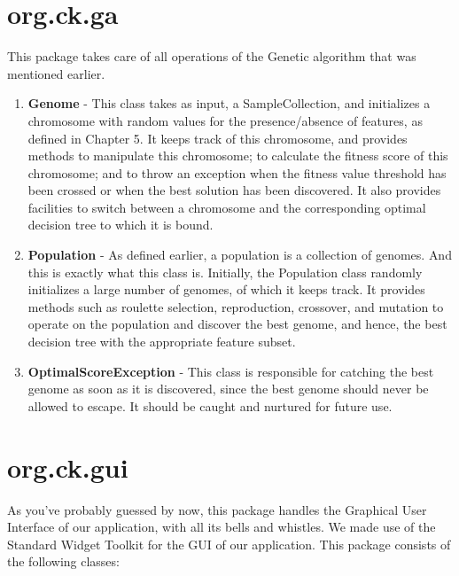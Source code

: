 \documentclass[12pt]{report}
\begin{document}
\section{org.ck.ga}
This package takes care of all operations of the Genetic algorithm that was mentioned earlier.

\begin{enumerate}
\item{\textbf{Genome}} - This class takes as input, a SampleCollection, and initializes a chromosome with random values for the presence/absence of features, as defined in Chapter 5. It keeps track of this chromosome, and provides methods to manipulate this chromosome; to calculate the fitness score of this chromosome; and to throw an exception when the fitness value threshold has been crossed or when the best solution has been discovered. It also provides facilities to switch between a chromosome and the corresponding optimal decision tree to which it is bound.


\item{\textbf{Population}} - As defined earlier, a population is a collection of genomes. And this is exactly what this class is. Initially, the Population class randomly initializes a large number of genomes, of which it keeps track. It provides methods such as roulette selection, reproduction, crossover, and mutation to operate on the population and discover the best genome, and hence, the best decision tree with the appropriate feature subset.

\item{\textbf{OptimalScoreException}} - This class is responsible for catching the best genome as soon as it is discovered, since the best genome should never be allowed to escape. It should be caught and nurtured for future use.

\end{enumerate}


\section{org.ck.gui}

As you've probably guessed by now, this package handles the Graphical User Interface of our application, with all its bells and whistles. We made use of the Standard Widget Toolkit for the GUI of our application. This package consists of the following classes:
\end{document}
